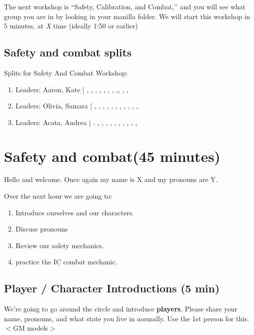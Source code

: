 \documentclass[green]{GL2020}
\begin{document}
The next workshop is ``Safety, Calibration, and Combat,’’ and you will see what group you are in by looking in your manilla folder.  We will start this workshop in 5 minutes, at \emph{X} time (ideally 1:50 or earlier)

\subsection*{Safety and combat splits}
Splits for Safety And Combat Workshop:
\begin{enumerate}
	\item Leaders: Aaron, Kate | \cChupStudent{}, \cChupInventor{}, \cChupSecond{}, \cChupAvenger{}, \cChupLeader{}, \cHeadScientist{}, \cAssistantScientist{}, \cTechStar{},\cPresident{}, \cBunker{}, \cLibrarian{}, \cInterpol{}
	\item Leaders: Olivia, Samara | \cDisney{}, \cHedonist{}, \cScholarship{}, \cBeetle{}, \cAntiChup{}, \cInitiate{}, \cWarlordDaughter{}, \cPirate{}, \cFlowPriest{}, \cEbbPriest{}, \cPrince{}, \cWildCard{}
	\item Leaders: Acata, Andrea | \cAmbition{}. \cHeir{}, \cDiplomat{}, \cEvil{}, \cPirateChild{}, \cMusic{}, \cAdopted{}, \cLibAssist{}, \cCurse{}, \cHistory{}, \cJuniorStatesman{}, \cEthics{}
\end{enumerate}

\section*{Safety and combat(45 minutes)}
Hello and welcome. Once again my name is X and my pronouns are Y.

Over the next hour we are going to:
\begin{enumerate}
	\item Introduce ourselves and our characters.
	\item Discuss pronouns
	\item Review our safety mechanics.
	\item practice the IC combat mechanic.
\end{enumerate}

\subsection*{Player / Character Introductions (5 min)}
We’re going to go around the circle and introduce \textbf{players}. Please share your name, pronouns, and what state you live in normally. Use the 1st person for this. $<$GM models$>$
\end{document}

